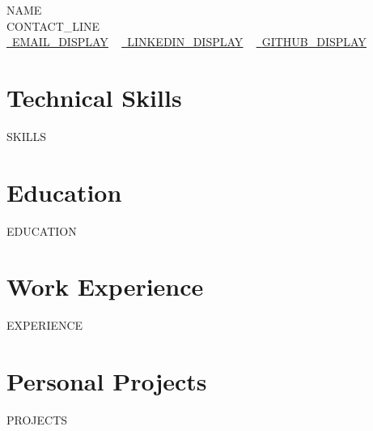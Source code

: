 \documentclass[letterpaper,11pt]{article}
\newcommand{\resumeSubHeadingListStart}{\begin{itemize}[leftmargin=0.0in, label={}]}
\newcommand{\resumeSubHeadingListEnd}{\end{itemize}}
\begin{document}
    \begin{center}
        {\Huge\scshape {{NAME}}}
        \\ {{CONTACT_LINE}}\\
        \small
        \href{mailto:{{EMAIL_URL}}}{\raisebox{-0.2\height}\faEnvelope\  \underline{{{EMAIL_DISPLAY}}}} ~
        \href{{{LINKEDIN_URL}}}{\raisebox{-0.2\height}\faLinkedin\ \underline{{{LINKEDIN_DISPLAY}}}}  ~
        \href{{{GITHUB_URL}}}{\raisebox{-0.2\height}\faGithub\ \underline{{{GITHUB_DISPLAY}}}}
    \end{center}

\section{Technical Skills}
\vspace{-7pt}
\begin{itemize}
[leftmargin=0.15in, label={}]\small{\item{
{{SKILLS}}
}}
\end{itemize}

\section{Education}
  \resumeSubHeadingListStart
{{EDUCATION}}
  \resumeSubHeadingListEnd

\section{Work Experience}
  \resumeSubHeadingListStart
{{EXPERIENCE}}
  \resumeSubHeadingListEnd

\section{Personal Projects}
\resumeSubHeadingListStart
{{PROJECTS}}
\resumeSubHeadingListEnd
\end{document}
